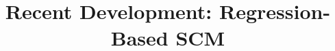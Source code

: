 \documentclass[hyperref={pdfpagelabels=false}]{beamer}
\begin{document}

\title[]{Recent Development: Regression-Based SCM}
\author{}
\institute{}
\date{}

\begin{frame}{}
\titlepage
\end{frame}
\end{document}
